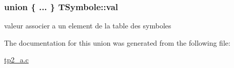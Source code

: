 \subsubsection[{\texorpdfstring{val}{val}}]{\setlength{\rightskip}{0pt plus 5cm}union \{ ... \}   T\+Symbole\+::val}\hypertarget{structTSymbole_a448dc40c2c8e5d050436fa598f528723}{}\label{structTSymbole_a448dc40c2c8e5d050436fa598f528723}
valeur associer a un element de la table des symboles 

The documentation for this union was generated from the following file\+:\begin{DoxyCompactItemize}
\item 
\hyperlink{tp2__a_8c}{tp2\+\_\+a.\+c}\end{DoxyCompactItemize}

